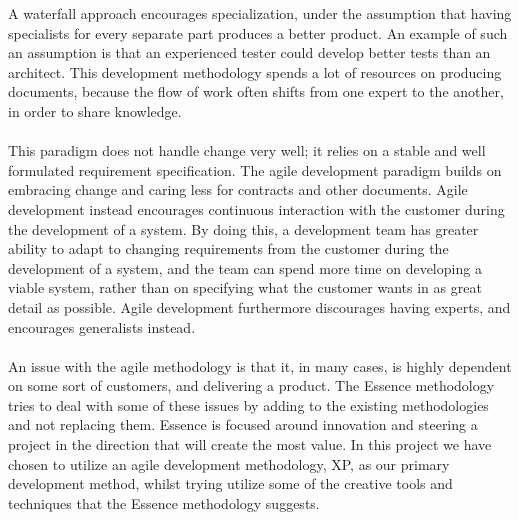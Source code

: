 A waterfall approach encourages specialization, under the assumption that having specialists for every separate part produces a better product. An example of such an assumption is that an experienced tester could develop better tests than an architect. This development methodology spends a lot of resources on producing documents, because the flow of work often shifts from one expert to the another, in order to share knowledge. 
\\\\
This paradigm does not handle change very well; it relies on a stable and well formulated requirement specification. The agile development paradigm builds on embracing change and caring less for contracts and other documents. Agile development instead encourages continuous interaction with the customer during the development of a system. By doing this, a development team has greater ability to adapt to changing requirements from the customer during the development of a system, and the team can spend more time on developing a viable system, rather than on specifying what the customer wants in as great detail as possible. Agile development furthermore discourages having experts, and encourages generalists instead.
\\\\
An issue with the agile methodology is that it, in many cases, is highly dependent on some sort of customers, and delivering a product. The Essence methodology tries to deal with some of these issues by adding to the existing methodologies and not replacing them. Essence is focused around innovation and steering a project in the direction that will create the most value. In this project we have chosen to utilize an agile development methodology, XP, as our primary development method, whilst trying utilize some of the creative tools and techniques that the Essence methodology suggests. 





